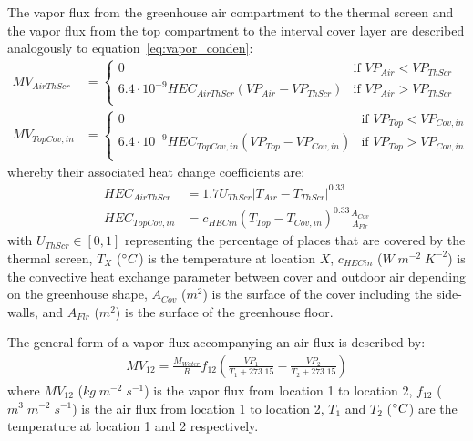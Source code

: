 \documentclass[a4paper]{article}
\begin{document}
The vapor flux from the greenhouse air compartment to the thermal screen and the vapor flux from the top compartment to the interval cover layer are described analogously to equation~\eqref{eq:vapor_conden}:
\begin{align}
  MV_{AirThScr}  & = \begin{cases}
    0                                                       & \text{if~} VP_{Air} < VP_{ThScr} \\
    6.4 \cdot 10^{-9} HEC_{AirThScr}(VP_{Air} - VP_{ThScr}) & \text{if~} VP_{Air} > VP_{ThScr} \\
  \end{cases} \\
  MV_{TopCov,in} & = \begin{cases}
    0                                                         & \text{if~} VP_{Top} < VP_{Cov,in} \\
    6.4 \cdot 10^{-9} HEC_{TopCov,in}(VP_{Top} - VP_{Cov,in}) & \text{if~} VP_{Top} > VP_{Cov,in} \\
  \end{cases}
\end{align}
whereby their associated heat change coefficients are:
\begin{align}
  HEC_{AirThScr}  & = 1.7 U_{ThScr} |T_{Air} - T_{ThScr}|^{0.33}                        \\
  HEC_{TopCov,in} & = {c_{HECin} (T_{Top} - T_{Cov,in})}^{0.33} \frac{A_{Cov}}{A_{Flr}}
\end{align}
with \(U_{ThScr} \in [0,1]\) representing the percentage of places that are covered by the thermal screen, \(T_X\) (\(\degree C\)) is the temperature at location \(X\), \(c_{HECin}\) (\(W\;m^{-2}\;K^{-2}\)) is the convective heat exchange parameter between cover and outdoor air depending on the greenhouse shape, \(A_{Cov}\) (\(m^2\)) is the surface of the cover including the side-walls, and \(A_{Flr}\) (\(m^2\)) is the surface of the greenhouse floor.

The general form of a vapor flux accompanying an air flux is described by:
\begin{align}
  \label{eq:vapor_air}
  MV_{12} = \frac{M_{Water}}{R} f_{12} \left(\frac{VP_1}{T_1 + 273.15} - \frac{VP_2}{T_2 + 273.15}\right)
\end{align}
where \(MV_{12}\) (\(kg\;m^{-2}\;s^{-1}\)) is the vapor flux from location 1 to location 2, \(f_{12}\) (\(m^3\;m^{-2}\;s^{-1}\)) is the air flux from location 1 to location 2, \(T_1\) and \(T_2\) (\(\degree C\)) are the temperature at location 1 and 2 respectively.
\end{document}
